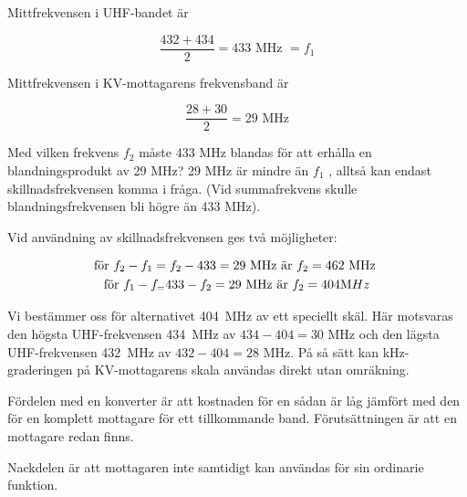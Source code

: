 Mittfrekvensen i UHF-bandet är

\[\frac{432+434}{2} = 433\text{ MHz } = f_1\]

Mittfrekvensen i KV-mottagarens frekvensband är

\[\frac{28 + 30}{2} = 29\text{ MHz}\]

Med vilken frekvens \(f_2\) måste 433 MHz blandas för att erhålla en
blandningsprodukt av 29 MHz? 29 MHz är mindre än \(f_1\) , alltså kan
endast skillnadsfrekvensen komma i fråga. (Vid summafrekvens skulle
blandningsfrekvensen bli högre än 433 MHz).

Vid användning av skillnadsfrekvensen ges två möjligheter:

\begin{gather*}
  \text{för }f_2 - f_1 = f_2 - 433 = 29\text{ MHz är }f_2 = 462\text{ MHz} \\
  \text{för }f_1 - f_ = 433 - f_2 = 29\text{ MHz är }f_2 = 404{\text MHz} \\
\end{gather*}

Vi bestämmer oss för alternativet 404~MHz av ett speciellt skäl. Här
motsvaras den högsta UHF-frekvensen 434~MHz av \(434 - 404 = 30\) MHz
och den lägsta UHF-frekvensen 432~MHz av \(432 - 404 = 28\) MHz. På så
sätt kan kHz-graderingen på KV-mottagarens skala användas direkt utan
omräkning.

Fördelen med en konverter är att kostnaden för en sådan är låg jämfört
med den för en komplett mottagare för ett tillkommande
band. Förutsättningen är att en mottagare redan finns.

Nackdelen är att mottagaren inte samtidigt kan användas för sin
ordinarie funktion.
